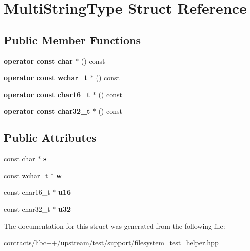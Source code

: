 \hypertarget{struct_multi_string_type}{}\section{Multi\+String\+Type Struct Reference}
\label{struct_multi_string_type}
\subsection*{Public Member Functions}
\begin{DoxyCompactItemize}
\item 
\mbox{\label{struct_multi_string_type_a489806a85906be0777e3c13bd043a510}} 
{\bfseries operator const char $\ast$} () const
\item 
\mbox{\label{struct_multi_string_type_a782fbec5f6ceba5d7ecc9c2012ce68ec}} 
{\bfseries operator const wchar\+\_\+t $\ast$} () const
\item 
\mbox{\label{struct_multi_string_type_a409205900485d15d181e5b8cf61d9f7c}} 
{\bfseries operator const char16\+\_\+t $\ast$} () const
\item 
\mbox{\label{struct_multi_string_type_ab945e139c4e5d960ca41d7166619df2d}} 
{\bfseries operator const char32\+\_\+t $\ast$} () const
\end{DoxyCompactItemize}
\subsection*{Public Attributes}
\begin{DoxyCompactItemize}
\item 
\mbox{\label{struct_multi_string_type_a72bc2b33f6ca5e1d2f985e2a204c94fd}} 
const char $\ast$ {\bfseries s}
\item 
\mbox{\label{struct_multi_string_type_ae9f767ba2db9bc4da571c9dac31efda9}} 
const wchar\+\_\+t $\ast$ {\bfseries w}
\item 
\mbox{\label{struct_multi_string_type_af2ce2f6753f74807bcb591696894974a}} 
const char16\+\_\+t $\ast$ {\bfseries u16}
\item 
\mbox{\label{struct_multi_string_type_a5b19948df825b45b100735e23981493f}} 
const char32\+\_\+t $\ast$ {\bfseries u32}
\end{DoxyCompactItemize}


The documentation for this struct was generated from the following file\+:\begin{DoxyCompactItemize}
\item 
contracts/libc++/upstream/test/support/filesystem\+\_\+test\+\_\+helper.\+hpp\end{DoxyCompactItemize}
